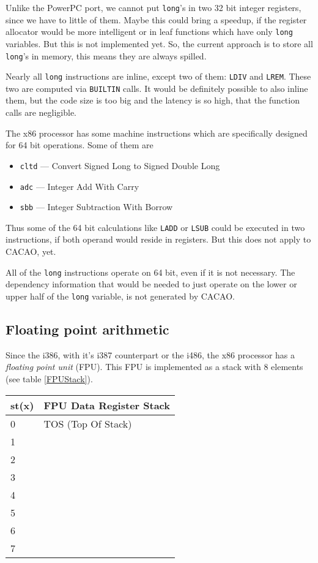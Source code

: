 Unlike the PowerPC port, we cannot put \texttt{long}'s in two 32 bit
integer registers, since we have to little of them. Maybe this could
bring a speedup, if the register allocator would be more intelligent
or in leaf functions which have only \texttt{long} variables. But this
is not implemented yet. So, the current approach is to store all
\texttt{long}'s in memory, this means they are always spilled.

Nearly all \texttt{long} instructions are inline, except two of them:
\texttt{LDIV} and \texttt{LREM}. These two are computed via
\texttt{BUILTIN} calls. It would be definitely possible to also
inline them, but the code size is too big and the latency is so high,
that the function calls are negligible.

The x86 processor has some machine instructions which are specifically
designed for 64 bit operations. Some of them are

\begin{itemize}
 \item \texttt{cltd} --- Convert Signed Long to Signed Double Long
 \item \texttt{adc} --- Integer Add With Carry
 \item \texttt{sbb} --- Integer Subtraction With Borrow
\end{itemize}

Thus some of the 64 bit calculations like \texttt{LADD} or
\texttt{LSUB} could be executed in two instructions, if both
operand would reside in registers. But this does not apply to CACAO,
yet.

All of the \texttt{long} instructions operate on 64 bit, even if it is
not necessary. The dependency information that would be needed to just
operate on the lower or upper half of the \texttt{long} variable, is
not generated by CACAO.


\subsection{Floating point arithmetic}

Since the i386, with it's i387 counterpart or the i486, the x86
processor has a \textit{floating point unit} (FPU). This FPU is
implemented as a stack with 8 elements (see table \ref{FPUStack}).

\begin{table*}
\begin{center}
\begin{tabular}[b]{|l|l|}
\hline 
st(x) & FPU Data Register Stack \\ \hline
0     & TOS (Top Of Stack) \\ \hline
1     & \\ \hline
2     & \\ \hline
3     & \\ \hline
4     & \\ \hline
5     & \\ \hline
6     & \\ \hline
7     & \\ \hline
\end{tabular}
\caption{x87 FPU Data Register Stack}
\label{FPUStack}
\end{center}
\end{table*}

